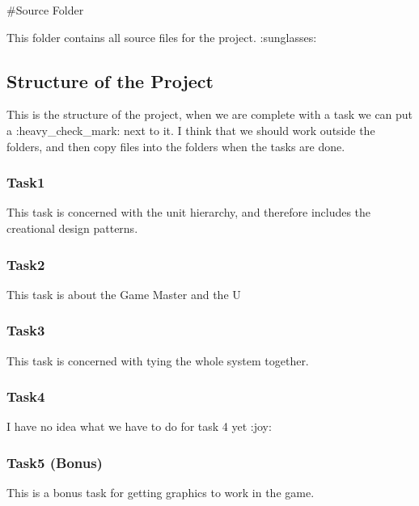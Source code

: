 \#\+Source Folder

This folder contains all source files for the project. \+:sunglasses\+:

\subsection*{Structure of the Project}

This is the structure of the project, when we are complete with a task we can put a \+:heavy\+\_\+check\+\_\+mark\+: next to it. I think that we should work outside the folders, and then copy files into the folders when the tasks are done.

\subsubsection*{Task1}

This task is concerned with the unit hierarchy, and therefore includes the creational design patterns.

\subsubsection*{Task2}

This task is about the Game Master and the U

\subsubsection*{Task3}

This task is concerned with tying the whole system together.

\subsubsection*{Task4}

I have no idea what we have to do for task 4 yet \+:joy\+:

\subsubsection*{Task5 (Bonus)}

This is a bonus task for getting graphics to work in the game. 